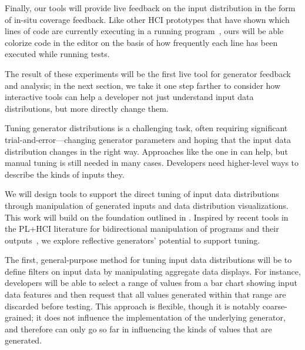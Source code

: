 Finally, our tools will provide live feedback on the input
distribution in the form of in-situ coverage feedback. Like other HCI
prototypes that have shown which lines of code are currently
executing in a running program~\cite{ref:brandt2010rehearse,
  ref:oney2009firecrystal, ref:burg2013record}, ours will be
able colorize code in the editor on the basis of
how frequently each line has been executed while running tests.

The result of these experiments will be the first live tool for generator
feedback and analysis; in the next section, we take it one step
farther to consider how interactive tools can help a developer not
just understand input data distributions, but more directly change
them.

%
Tuning generator distributions is a challenging task, often requiring
significant trial-and-error---changing generator parameters and hoping
that the input data distribution changes in the right way. Approaches
like the one in  can help, but manual tuning
is still needed in many cases.
Developers need higher-level ways to describe the kinds of inputs they.

We will design tools to support the direct tuning of input data distributions
through manipulation of generated inputs and data distribution
visualizations. This work will build on the foundation outlined in
. Inspired by recent tools in
the PL+HCI literature
for bidirectional manipulation of programs and their
outputs~\cite{ref:hempel2019sketch, ref:kery2020mage,
  ref:omar2012active, ref:omar2021filling},
we explore reflective generators' potential to support tuning.

The first, general-purpose method for tuning input data distributions will be to
define filters on input data by manipulating aggregate data displays.
For instance, developers will be able to select a range of values from a bar
chart showing input data features and then request that all values generated
within that range are discarded before testing. This approach is flexible,
though it is notably coarse-grained;
it does not influence the implementation of the underlying generator, and
therefore can only go so far in influencing the kinds of values that are
generated.

